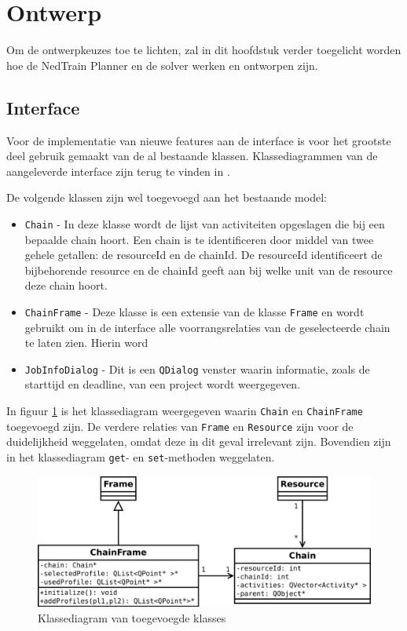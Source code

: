 \section{Ontwerp}
Om de ontwerpkeuzes toe te lichten, zal in dit hoofdstuk verder toegelicht worden hoe de NedTrain Planner en de solver werken en ontworpen zijn.

\subsection{Interface}
Voor de implementatie van nieuwe features aan de interface is voor het grootste deel gebruik gemaakt van de al bestaande klassen. Klassediagrammen van de aangeleverde interface zijn terug te vinden in \cite{bep2012nedtrain}.

De volgende klassen zijn wel toegevoegd aan het bestaande model:
\begin{itemize}
\item \texttt{Chain} - In deze klasse wordt de lijst van activiteiten opgeslagen die bij een bepaalde chain hoort. Een chain is te identificeren door middel van twee gehele getallen: de resourceId en de chainId. De resourceId identificeert de bijbehorende resource en de chainId geeft aan bij welke unit van de resource deze chain hoort.
\item \texttt{ChainFrame} - Deze klasse is een extensie van de klasse \texttt{Frame} en wordt gebruikt om in de interface alle voorrangsrelaties van de geselecteerde chain te laten zien. Hierin word
\item \texttt{JobInfoDialog} - Dit is een \texttt{QDialog} venster waarin informatie, zoals de starttijd en deadline, van een project wordt weergegeven.
\end{itemize}

In figuur \ref{fig:klassediagram} is het klassediagram weergegeven waarin \texttt{Chain} en \texttt{ChainFrame} toegevoegd zijn. De verdere relaties van \texttt{Frame} en \texttt{Resource} zijn voor de duidelijkheid weggelaten, omdat deze in dit geval irrelevant zijn. Bovendien zijn in het klassediagram \texttt{get}- en \texttt{set}-methoden weggelaten.

\begin{figure}[H]
\centering
\includegraphics[width=.95\textwidth]{../images/klasse-diagram.png}
\caption{Klassediagram van toegevoegde klasses}
\label{fig:klassediagram}
\end{figure}

